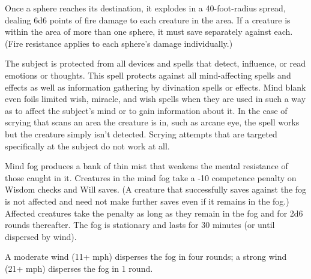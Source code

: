 \begin{multicols}{2}
\begin{small}
\smallskip\noindent Once a sphere reaches its destination, it explodes in a 40-foot-radius spread, dealing 6d6 points of fire damage to each creature in the area. If a creature is within the area of more than one sphere, it must save separately against each. (Fire resistance applies to each sphere's damage individually.)

\noindent The subject is protected from all devices and spells that detect, influence, or read emotions or thoughts. This spell protects against all mind-affecting spells and effects as well as information gathering by divination spells or effects. Mind blank even foils limited wish, miracle, and wish spells when they are used in such a way as to affect the subject's mind or to gain information about it. In the case of scrying that scans an area the creature is in, such as arcane eye, the spell works but the creature simply isn't detected. Scrying attempts that are targeted specifically at the subject do not work at all.

\noindent Mind fog produces a bank of thin mist that weakens the mental resistance of those caught in it. Creatures in the mind fog take a -10 competence penalty on Wisdom checks and Will saves. (A creature that successfully saves against the fog is not affected and need not make further saves even if it remains in the fog.) Affected creatures take the penalty as long as they remain in the fog and for 2d6 rounds thereafter. The fog is stationary and lasts for 30 minutes (or until dispersed by wind).

\smallskip\noindent A moderate wind (11+ mph) disperses the fog in four rounds; a strong wind (21+ mph) disperses the fog in 1 round.


\end{small}
\end{multicols}
